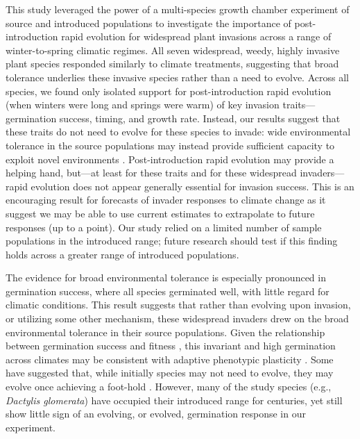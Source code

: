 \documentclass[11pt]{article}\usepackage[]{graphicx}\usepackage[]{color}
\begin{document}
	This study leveraged the power of a multi-species growth chamber experiment of source and introduced populations to investigate the importance of post-introduction rapid evolution for widespread plant invasions across a range of winter-to-spring climatic regimes.  All seven widespread, weedy, highly invasive plant species responded similarly to climate treatments, suggesting that broad tolerance underlies these invasive species rather than a need to evolve. Across all species, we found only isolated support for post-introduction rapid evolution (when winters were long and springs were warm) of key invasion traits---germination success, timing, and growth rate. Instead, our results suggest that these traits do not need to evolve for these species to invade:  wide environmental tolerance in the source populations may instead provide sufficient capacity to exploit novel environments \parencite{Baker1965}. Post-introduction rapid evolution may provide a helping hand, but---at least for these traits and for these widespread invaders---rapid evolution does not appear generally essential for invasion success. This is an encouraging result for forecasts of invader responses to climate change as it suggest we may be able to use current estimates to extrapolate to future responses (up to a point). Our study relied on a limited number of sample populations in the introduced range; future research should test if this finding holds across a greater range of  introduced populations. 
	
	The evidence for broad environmental tolerance is especially pronounced in germination success, where all species germinated well, with little regard for climatic conditions. This result suggests that rather than evolving upon invasion, or utilizing some other mechanism, these widespread invaders drew on the broad environmental tolerance in their source populations. Given the relationship between germination success and fitness \parencite[e.g.,][]{Domic2020}, this invariant and high germination across climates may be consistent with adaptive phenotypic plasticity \parencite{Baker1965}. Some have suggested that, while initially species may not need to evolve, they may evolve once achieving a foot-hold \parencite{Lamarque2015}. However, many of the study species (e.g., \textit{Dactylis glomerata}) have occupied their introduced range for centuries, yet still show little sign of an evolving, or evolved, germination response in our experiment. 
\end{document}
